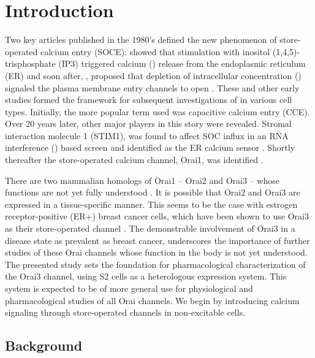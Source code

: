 \chapter{Introduction}
Two key articles published in the 1980's defined the new phenomenon of store-operated calcium entry (SOCE): \citet{Streb:1983p278} showed that stimulation with inositol (1,4,5)-trisphosphate (IP3) triggered calcium (\Ca) release from the endoplasmic reticulum (ER) and soon after, %
\citet{Putney:1986p283}, proposed that depletion of intracellular \Ca{} concentration (\cai) signaled the plasma membrane \Ca{} entry channels to open \citep{Taylor2006}. These and other
early studies %
\citep{Hoth:1992p527,Zweifach1993} formed the framework for subsequent investigations of \SOCE{} in various cell types. Initially, the more popular term used was capacitive calcium entry (CCE). Over 20 years later, other major players in this story were revealed. Stromal interaction molecule 1 (STIM1), was found to affect SOC influx in an RNA interference (\rnai) based screen and identified as the ER calcium sensor \citep{Roos2005, Liou2005, Zhang2005}. Shortly thereafter the store-operated calcium channel, Orai1, was identified \citep{Feske2006, Prakriya2006, Vig2006, Zhang2006, Smyth2010}. 

There are two mammalian homologs of Orai1 -- Orai2 and Orai3 -- whose functions are not yet fully understood \citep{Roos2005,Vig2006,Taylor2006,Smyth2010}. It is possible that Orai2 and Orai3 are expressed in a tissue-specific manner. This seems to be the case with estrogen receptor-positive (ER+) breast cancer cells, which have been shown to use Orai3 as their store-operated \Ca{} channel \citep{Motiani2010, Dellis2011}. The demonstrable involvement of Orai3 in a disease state as prevalent as breast cancer, underscores the importance of further studies of these Orai channels whose function in the body is not yet understood. The presented study sets the foundation for pharmacological characterization of the Orai3 \Ca{} channel, using \droso{} S2 cells as a heterologous expression system. This system is expected to be of more general use for physiological and pharmacological studies of all Orai channels. We begin by introducing calcium signaling through store-operated channels in non-excitable cells. 



\section{Background}


